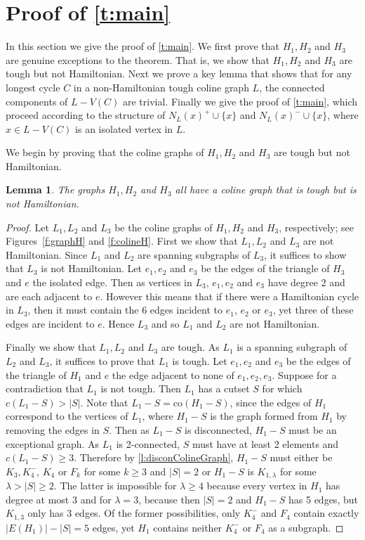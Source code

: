 \documentclass[12pt]{article}
\newtheorem{lem}[thm]{Lemma}
\theoremstyle{definition}
\newcommand{\co}{\text{co}}
\begin{document}
\section{Proof of \cref{t:main}}\label{s:main}
In this section we give the proof of \cref{t:main}. We first prove that $H_1,H_2$ and $H_3$ are genuine exceptions to the theorem. That is, we show that $H_1,H_2$ and $H_3$ are tough but not Hamiltonian. Next we prove a key lemma that shows that for any longest cycle $C$ in a non-Hamiltonian tough coline graph $L$, the connected components of $L-V(C)$ are trivial.
Finally we give the proof of \cref{t:main}, which proceed according to the structure of $N_L(x)^+ \cup \{x\}$ and $N_L(x)^- \cup \{x\}$, where $x \in L-V(C)$ is an isolated vertex in $L$. 

We begin by proving that the coline graphs of $H_1,H_2$ and $H_3$ are tough but not Hamiltonian.
\begin{lem}\label{l:Hs}
The graphs $H_1,H_2$ and $H_3$ all have a coline graph that is tough but is not Hamiltonian.
\end{lem}
\begin{proof}
Let $L_1,L_2$ and $L_3$ be the  coline graphs of $H_1,H_2$ and $H_3$, respectively; see Figures~\ref{f:graphH} and \ref{f:colineH}.
First we show that $L_1,L_2$ and $L_3$ are not Hamiltonian. 
Since $L_1$ and $L_2$ are spanning subgraphs of $L_3$, it suffices to show that $L_3$ is not Hamiltonian. Let $e_1,e_2$ and $e_3$ be the edges of the triangle of $H_3$ and $e$ the isolated edge. Then as vertices in $L_3$, $e_1,e_2$ and $e_3$ have degree 2 and are each adjacent to $e$. However this means that if there were a Hamiltonian cycle in $L_3$, then it must contain the 6 edges incident to $e_1$, $e_2$ or $e_3$, yet three of these edges are incident to $e$. Hence $L_3$ and so $L_1$ and $L_2$ are not Hamiltonian.

Finally we show that $L_1,L_2$ and $L_3$ are tough.
As $L_1$ is a spanning subgraph of $L_2$ and $L_3$, it suffices to prove that $L_1$ is tough.
Let $e_1,e_2$ and $e_3$ be the edges of the triangle of $H_1$ and $e$ the edge adjacent to none of $e_1,e_2,e_3$.
Suppose for a contradiction that $L_1$ is not tough. Then $L_1$ has a cutset $S$ 
for which $c(L_1-S) >|S|$. Note that $L_1-S = \co(H_1-S)$, since the edges of $H_1$ correspond to the vertices of $L_1$,
where $H_1-S$ is the graph formed from $H_1$ by removing the edges in $S$. Then as $L_1-S$ is disconnected, $H_1-S$  must be an exceptional graph. As $L_1$ is 2-connected, $S$ must have at least 2 elements and $c(L_1-S)\geq 3$.
Therefore by \cref{l:disconColineGraph}, $H_1-S$ must either be  $K_{3}, K_4^-$, $K_4$ or $F_k$ for some $k \geq 3$ and $|S|=2$ or $H_1-S$ is $K_{1,\lambda}$ for some $\lambda > |S| \geq 2$.
The latter is impossible for $\lambda \geq 4$ because every vertex in $H_1$ has degree at most 3 and for $\lambda=3$, because then $|S|=2$ and $H_1-S$ has 5 edges, but $K_{1,3}$ only has 3 edges. Of the former possibilities, only $K_4^-$ and $F_4$ contain exactly $|E(H_1)|-|S|=5$ edges, yet $H_1$ contains neither $K_4^-$ or $F_4$ as a subgraph. 
\end{proof}
\end{document}
